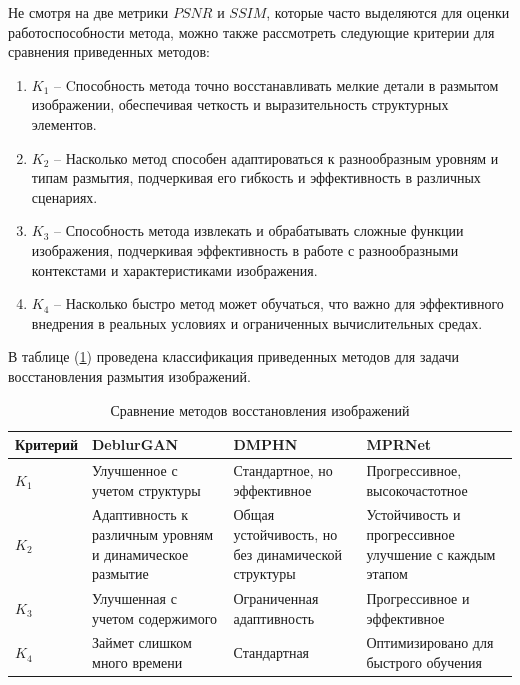 Не смотря на две метрики \(PSNR\) и \(SSIM\), которые часто выделяются для оценки работоспособности метода, можно также рассмотреть следующие критерии для сравнения приведенных методов:
\begin{enumerate}
	\item \(K_{1}\) -- Cпособность метода точно восстанавливать мелкие детали в размытом изображении, обеспечивая четкость и выразительность структурных элементов.
	\item \(K_{2}\) -- Насколько метод способен адаптироваться к разнообразным уровням и типам размытия, подчеркивая его гибкость и эффективность в различных сценариях.
	\item \(K_{3}\) -- Способность метода извлекать и обрабатывать сложные функции изображения, подчеркивая эффективность в работе с разнообразными контекстами и характеристиками изображения.
	\item \(K_{4}\) -- Насколько быстро метод может обучаться, что важно для эффективного внедрения в реальных условиях и ограниченных вычислительных средах.
\end{enumerate}

В таблице (\ref{tab:comparison}) проведена классификация приведенных методов для задачи восстановления размытия изображений.

\begin{table}[H]
    \centering
    \caption{Сравнение методов восстановления изображений}
    \label{tab:comparison}
    \begin{tabular}{|p{3cm}|p{3.5cm}|p{3.5cm}|p{3.7cm}|}
        \hline
        \textbf{Критерий} & \textbf{DeblurGAN} & \textbf{DMPHN} & \textbf{MPRNet} \\ \hline
        \(K_{1}\) & Улучшенное с учетом структуры & Стандартное, но эффективное & Прогрессивное, высокочастотное \\ \hline
        \(K_{2}\) & Адаптивность к различным уровням и динамическое размытие & Общая устойчивость, но без динамической структуры & Устойчивость и прогрессивное улучшение с каждым этапом \\ \hline
        \(K_{3}\) & Улучшенная с учетом содержимого & Ограниченная адаптивность & Прогрессивное и эффективное \\ \hline
        \(K_{4}\) & Займет слишком много времени & Стандартная & Оптимизировано для быстрого обучения \\ \hline
    \end{tabular}
\end{table}


